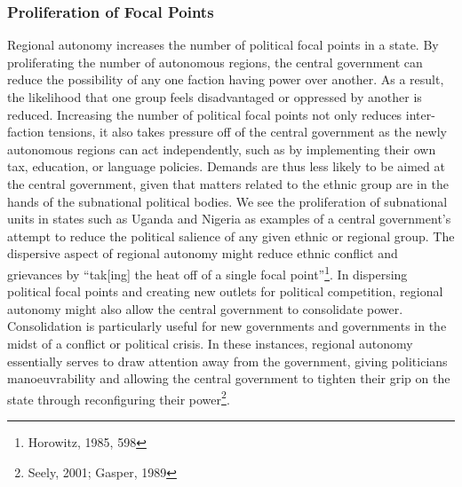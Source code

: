 \documentclass[12pt]{article}
\begin{document}
\subsubsection{Proliferation of Focal Points}
Regional autonomy increases the number of political focal points in a state. By proliferating the number of autonomous regions, the central government can reduce the possibility of any one faction having power over another. As a result, the likelihood that one group feels disadvantaged or oppressed by another is reduced. Increasing the number of political focal points not only reduces inter-faction tensions, it also takes pressure off of the central government as the newly autonomous regions can act independently, such as by implementing their own tax, education, or language policies. Demands are thus less likely to be aimed at the central government, given that matters related to the ethnic group are in the hands of the subnational political bodies. We see the proliferation of subnational units in states such as Uganda and Nigeria as examples of a central government’s attempt to reduce the political salience of any given ethnic or regional group. The dispersive aspect of regional autonomy might reduce ethnic conflict and grievances by ``tak[ing] the heat off of a single focal point''\footnote{Horowitz, 1985, 598}. In dispersing political focal points and creating new outlets for political competition, regional autonomy might also allow the central government to consolidate power. Consolidation is particularly useful for new governments and governments in the midst of a conflict or political crisis. In these instances, regional autonomy essentially serves to draw attention away from the government, giving politicians manoeuvrability and allowing the central government to tighten their grip on the state through reconfiguring their power\footnote{Seely, 2001; Gasper, 1989}.
\end{document}
